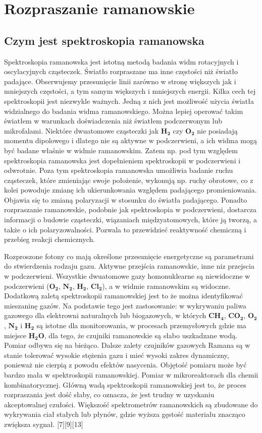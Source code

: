 \newpage

\section{Rozpraszanie ramanowskie}
\subsection{Czym jest spektroskopia ramanowska}
Spektroskopia ramanowska jest istotną metodą badania widm rotacyjnych i oscylacyjnych cząsteczek. Światło rozpraszane ma inne częstości niż światło padające. Obserwujemy przesunięcie linii zarówno w stronę większych jak i mniejszych częstości, a tym samym większych i mniejszych energii. Kilka cech tej spektroskopii jest niezwykle ważnych. Jedną z nich jest możliwość użycia światła widzialnego do badania widma ramanowskiego. Można lepiej operować takim światłem w warunkach doświadczenia niż światłem podczerwonym lub mikrofalami. Niektóre dwuatomowe cząsteczki jak $\mathbf{H_{2}}$ czy $\mathbf{O_{2}}$ nie posiadają momentu dipolowego i dlatego nie są aktywne w podczerwieni, a ich widma mogą być badane właśnie w widmie ramanowskim. Zatem np. pod tym względem spektroskopia ramanowska jest dopełnieniem spektroskopii w podczerwieni i odwrotnie. Poza tym spektroskopia ramanowska umożliwia badanie ruchu cząsteczek, które zmieniając swoje położenie, wykonują np. ruchy obrotowe, co z kolei powoduje zmianę ich ukierunkowania względem padającego promieniowania. Objawia się to zmianą polaryzacji w stosunku do światła padającego. Ponadto rozpraszanie ramanowskie, podobnie jak spektroskopia w podczerwieni, dostarcza informacji o budowie cząsteczki, wiązaniach międzyatomowych, które ją tworzą, a także o ich polaryzowalności. Pozwala to przewidzieć reaktywność chemiczną i przebieg reakcji chemicznych.

Rozproszone fotony co mają określone przesunięcie energetyczne są parametrami do stwierdzenia rodzaju gazu. Aktywne przejścia ramanowskie, inne niz przejscia w podczerwieni. Wszystkie dwuatomowe gazy homonuklearne są niewidoczne w podczerwieni ($\mathbf{O_{2}}$, $\mathbf{N_{2}}$, $\mathbf{H_{2}}$, $\mathbf{Cl_{2}}$), a w widmie ramanowskim są widoczne. Dodatkową zaletą spektroskopii ramanowskiej jest to że można identyfikować mieszaninę gazów. Na podstawie tego jest zastosowanie: w wykrywaniu paliwa gazowego dla elektrowni naturalnych lub biogazowych, w których $\mathbf{CH_{4}}$, $\mathbf{CO_{2}}$, $\mathbf{O_{2}}$, $\mathbf{N_{2}}$ i $\mathbf{H_{2}}$ są istotne dla monitorowania, w procesach przemysłowych gdzie ma miejsce $\mathbf{H_{2}O}$, dla tego, że czujniki ramanowskie są słabo uszkadzane wodą. Pomiar odbywa się na bieżąco. Dalsze zalety czujników gazowych Ramana są w stanie tolerować wysokie stężenia gazu i mieć wysoki zakres dynamiczny, ponieważ nie cierpią z powodu efektów nasycenia. Objętość pomiaru może być bardzo mała w spektroskopii ramanowskiej. Pomiar w mikroreaktorach dla chemii kombinatorycznej. Główną wadą spektroskopii ramanowskiej jest to, że proces rozpraszania jest dość słaby, co oznacza, że jest trudny w uzyskaniu akceptowalnej czułości. Większość spektrometrów ramanowskich są zbudowane do wykrywania ciał stałych lub płynów, gdzie wyższa gęstość materiału znacząco zwiększa sygnał. [7][9][13]

